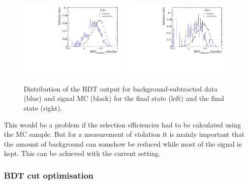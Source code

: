 \begin{figure}[htbp]
    \centering
    \includegraphics[width=0.49\textwidth]{07-B02DD/figs/BDTComparison_Kpipi.pdf}
    \includegraphics[width=0.49\textwidth]{07-B02DD/figs/BDTComparison_KKpi.pdf}
    \caption{Distribution of the BDT output for background-subtracted data (blue) and
    signal MC (black) for the \KpipiKpipi final state (left) and the
    \KKpiKpipi final state (right).}
    \label{fig:b02dd:selection:mva:bdtcomparison}
\end{figure}
%
This would be a problem if the selection efficiencies had to be calculated
using the MC sample. But for a measurement of \CP violation it is mainly
important that the amount of background can somehow be reduced while most of
the signal is kept. This can be achieved with the current setting.

\subsubsection*{BDT cut optimisation}
\label{sec:b02dd:selection:mva:optimisation}

